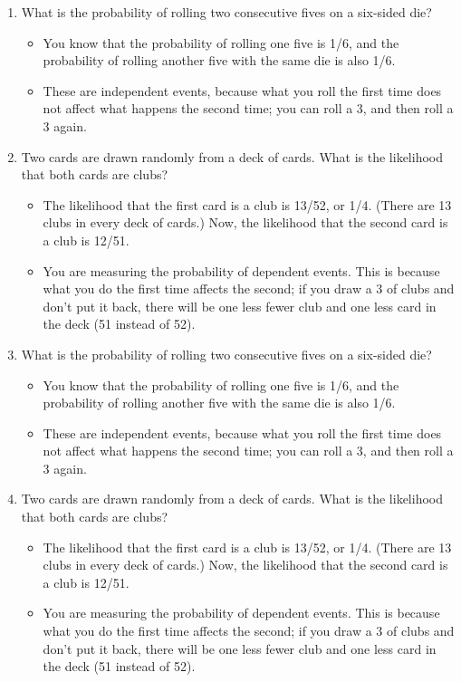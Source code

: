 \documentclass[]{report}
\begin{document}

\begin{enumerate}[(1)]
\item What is the probability of rolling two consecutive fives on a six-sided die?
\begin{itemize}
	\item You know that the probability of rolling one five is 1/6, and the probability of rolling another five with the same die is also 1/6.
	\item These are independent events, because what you roll the first time does not affect what happens the second time; you can roll a 3, and then roll a 3 again.
\end{itemize}


\item  Two cards are drawn randomly from a deck of cards. What is the likelihood that both cards are clubs?
\begin{itemize}
	\item The likelihood that the first card is a club is 13/52, or 1/4. (There are 13 clubs in every deck of cards.) Now, the likelihood that the second card is a club is 12/51.
	\item You are measuring the probability of dependent events. This is because what you do the first time affects the second; if you draw a 3 of clubs and don't put it back, there will be one less fewer club and one less card in the deck (51 instead of 52).
\end{itemize}

\item What is the probability of rolling two consecutive fives on a six-sided die?
\begin{itemize}
	\item You know that the probability of rolling one five is 1/6, and the probability of rolling another five with the same die is also 1/6.
	\item These are independent events, because what you roll the first time does not affect what happens the second time; you can roll a 3, and then roll a 3 again.
\end{itemize}


\item Two cards are drawn randomly from a deck of cards. What is the likelihood that both cards are clubs?
\begin{itemize}
	\item The likelihood that the first card is a club is 13/52, or 1/4. (There are 13 clubs in every deck of cards.) Now, the likelihood that the second card is a club is 12/51.
	\item You are measuring the probability of dependent events. This is because what you do the first time affects the second; if you draw a 3 of clubs and don't put it back, there will be one less fewer club and one less card in the deck (51 instead of 52).
\end{itemize}


\end{enumerate}
\end{document}
